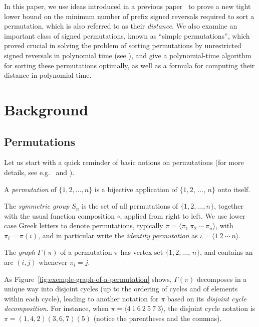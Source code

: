 \documentclass[review]{elsarticle}
\newcommand{\eg}{e.g.\ }
\begin{document}
In this paper, we use ideas introduced in a previous paper~\cite{labarre-edit} to prove a new tight lower bound on the minimum number of prefix signed reversals required to sort a permutation, which is also referred to as their \emph{distance}. We also examine an important class of signed permutations, known as ``simple permutations'', which proved crucial in solving the problem of sorting permutations by unrestricted signed reversals in polynomial time (see \citet{hannenhalli-transforming}), and give a polynomial-time algorithm for sorting these permutations optimally, as well as a formula for computing their distance in polynomial time. 


\section{Background}

\subsection{Permutations}

Let us start with a quick reminder of basic notions on permutations (for more details, see \eg \citet{bjorner-combinatorics} and \citet{wielandt-finite}). 

\begin{definition}
A \emph{permutation} of $\{1, 2, \ldots, n\}$ is a bijective application of $\{1, 2$, $\ldots$, $n\}$ onto itself.
\end{definition}

The \emph{symmetric group} $S_n$ is the set of all permutations of $\{1, 2, \ldots, n\}$, together with the usual function composition $\circ$, applied from right to left. We use lower case Greek letters to denote permutations, typically $\pi=\langle\pi_1\ \pi_2\ \cdots\ \pi_n\rangle$, with $\pi_i=\pi(i)$, and in particular write the \emph{identity permutation} as $\iota=\langle 1\ 2\ \cdots\ n\rangle$.

\begin{definition}
The \emph{graph} $\Gamma(\pi)$ of a permutation $\pi$ has vertex set $\{1,2,\ldots$, $n\}$, and  contains an arc $(i,j)$ whenever $\pi_i=j$.
\end{definition}

As Figure~\ref{fig:exemple-graph-of-a-permutation} shows, $\Gamma(\pi)$ decomposes in a unique way into disjoint cycles (up to the ordering of cycles and of elements within each cycle), leading to another notation for $\pi$ based on its \emph{disjoint cycle decomposition}.  For instance, when $\pi=\langle 4\ 1\ 6\ 2\ 5\ 7\ 3\rangle$, the disjoint cycle notation is $\pi=(1,4,2)(3,6,7)(5)$ (notice the parentheses and the commas). 
\end{document}
